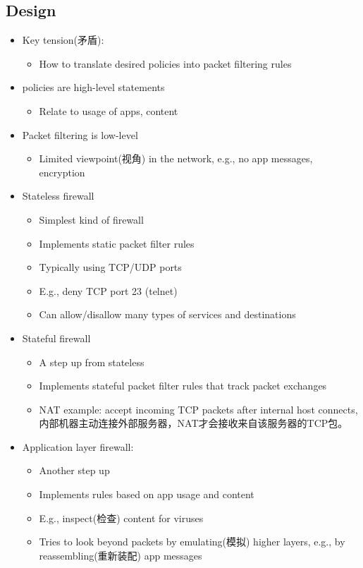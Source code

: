 \documentclass[12pt]{ctexart}   %
\begin{document}
	\subsection{Design}
	\begin{itemize}
		\item Key tension(矛盾):
		\begin{itemize}
			\item How to translate desired policies into packet filtering rules
		\end{itemize}

		\item policies are high-level statements
		\begin{itemize}
			\item Relate to usage of apps, content
		\end{itemize}

		\item Packet filtering is low-level
		\begin{itemize}
			\item Limited viewpoint(视角) in the network, e.g., no app messages, encryption
		\end{itemize}

		\item Stateless firewall
		\begin{itemize}
			\item Simplest kind of firewall
			\item Implements static packet filter rules
			\item Typically using TCP/UDP ports
			\item E.g., deny TCP port 23 (telnet)
			\item Can allow/disallow many types of services and destinations
		\end{itemize}

		\item Stateful firewall
		\begin{itemize}
			\item A step up from stateless
			\item Implements stateful packet filter rules that track packet exchanges
			\item NAT example: accept incoming TCP packets after internal host connects, 内部机器主动连接外部服务器，NAT才会接收来自该服务器的TCP包。
		\end{itemize}

		\item Application layer firewall:
		\begin{itemize}
			\item Another step up
			\item Implements rules based on app usage and content 
			\item E.g., inspect(检查) content for viruses
			\item Tries to look beyond packets by emulating(模拟) higher layers, e.g., by reassembling(重新装配) app messages
		\end{itemize}
	\end{itemize}
\end{document}
